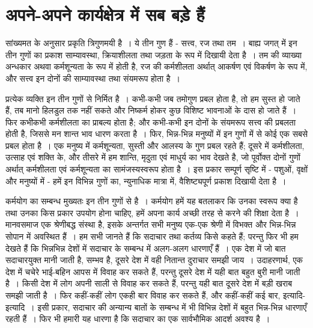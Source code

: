 
\chapter{अपने-अपने कार्यक्षेत्र में सब बड़े हैं}

सांख्यमत के अनुसार प्रकृति त्रिगुणमयी है~। ये तीन गुण हैं - सत्त्व, रज तथा तम~। बाह्य जगत् में इन तीन गुणों का प्रकाश साम्यावस्था, क्रियाशीलता तथा जड़ता के रूप में दिखायी देता है~। तम की व्याख्या अन्धकार अथवा कर्मशून्यता के रूप में होती है, रज की कर्मशीलता अर्थात् आकर्षण एवं विकर्षण के रूप में, और सत्त्व इन दोनों की साम्यावस्था तथा संयमरूप होता है~।

प्रत्येक व्यक्ति इन तीन गुणों से निर्मित है~। कभी-कभी जब तमोगुण प्रबल होता है, तो हम सुस्त हो जाते हैं, तब मानो हिलडुल तक नहीं सकते और निष्कर्म होकर कुछ विशिष्ट भावनाओं के दास हो जाते हैं~। फिर कभीकभी कर्मशीलता का प्राबल्य होता है; और कभी-कभी इन दोनों के संयमरूप सत्त्व की प्रबलता होती है, जिससे मन शान्त भाव धारण करता है~। फिर, भिन्न-भिन्न मनुष्यों में इन गुणों में से कोई एक सबसे प्रबल होता है~। एक मनुष्य में कर्मशून्यता, सुस्ती और आलस्य के गुण प्रबल रहते हैं; दूसरे में कर्मशीलता, उत्साह एवं शक्ति के, और तीसरे में हम शान्ति, मृदुता एवं माधुर्य का भाव देखते है, जो पूर्वोक्त दोनों गुणों अर्थात् कर्मशीलता एवं कर्मशून्यता का सामंजस्यस्वरूप होता है~। इस प्रकार सम्पूर्ण सृष्टि में - पशुओं, वृक्षों और मनुष्यों में - हमें इन विभिन्न गुणों का, न्युनाधिक मात्रा में, वैशिष्ट्यपूर्ण प्रकाश दिखायी देता है~।

कर्मयोग का सम्बन्ध मुख्यतः इन तीन गुणों से है~। कर्मयोग हमें यह बतलाकर कि उनका स्वरूप क्या है तथा उनका किस प्रकार उपयोग होना चाहिए, हमें अपना कार्य अच्छी तरह से करने की शिक्षा देता है~। मानवसमाज एक श्रेणीबद्ध संस्था है, इसके अन्तर्गत सभी मनुष्य एक-एक श्रेणी में विभक्त और भिन्न-भिन्न सोपान में अवस्थित हैं~। हम सभी जानते हैं कि सदाचार तथा कर्तव्य किसे कहते हैं; परन्तु फिर भी हम देखते हैं कि भिन्नभिन्न देशों में सदाचार के सम्बन्ध में अलग-अलग धारणाएँ हैं~। एक देश में जो बात सदाचारयुक्त मानी जाती है, सम्भव है, दूसरे देश में वही नितान्त दुराचार समझी जाय~। उदाहरणार्थ, एक देश में चचेरे भाई-बहिन आपस में विवाह कर सकते हैं, परन्तु दूसरे देश में यही बात बहुत बुरी मानी जाती है~। किसी देश में लोग अपनी साली से विवाह कर सकते हैं, परन्तु यही बात दूसरे देश में बड़ी खराब समझी जाती है~। फिर कहीं-कहीं लोग एकही बार विवाह कर सकते हैं, और कहीं-कहीं कई बार, इत्यादि-इत्यादि~। इसी प्रकार, सदाचार की अन्यान्य बातों के सम्बन्ध में भी विभिन्न देशों में बहुत भिन्न-भिन्न धारणाएँ रहती हैं~। फिर भी हमारी यह धारणा है कि सदाचार का एक सार्वभौमिक आदर्श अवश्य है~।

